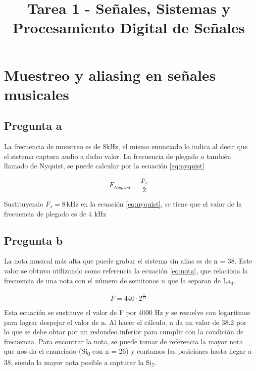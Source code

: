 \documentclass[conference]{IEEEtran}
\title{Tarea 1 - Señales, Sistemas y Procesamiento Digital de Señales}
\author{\IEEEauthorblockN{Zúñiga Ramírez Jose Eduardo}
\IEEEauthorblockA{Escuela de Ingeniería Electrónica \\
Instituto Tecnológico de Costa Rica \\
\{je.zuniga\}@estudiantec.cr}
}
\date{}
\begin{document}
\maketitle

\sloppy





\section{Muestreo y aliasing en señales musicales}

\subsection{Pregunta a}
La frecuencia de muestreo es de 8kHz, el mismo enunciado lo indica al decir que el sistema captura audio a dicho valor.
La frecuencia de plegado o también llamado de Nyquist, se puede calcular por la ecuación \eqref{eq:nyquist}

\begin{equation}
F_{Nyquist} = \frac{F_s}{2}
\label{eq:nyquist}
\end{equation}


Sustituyendo $F_s = 8\,\text{kHz}$ en la ecuación \eqref{eq:nyquist}, se tiene que el valor de la frecuencia de plegado es de 4 kHz

\subsection{Pregunta b}

La nota musical más alta que puede grabar el sistema sin alias es de n = 38.
Este valor se obtuvo utilizando como referencia la ecuación \eqref{eq:nota}, que relaciona la frecuencia de una nota con el número de semitonos $n$ que la separan de La\textsubscript{4}.

\begin{equation}
F = 440 \cdot 2^{\frac{n}{12}}
\label{eq:nota}
\end{equation}

Esta ecuación se sustituye el valor de F por 4000 Hz y se resuelve con logaritmos para lograr despejar el valor de n. 
Al hacer el cálculo, n da un valor de 38.2 por lo que se debe obtar por un redondeo inferior para cumplir con la condición de frecuencia. 
Para encontrar la nota, se puede tomar de referencia la mayor nota que nos da el enunciado (Si\textsubscript{6} con n = 26) y contamos las posiciones hasta llegar a 38, siendo la mayor nota posible a capturar la Si\textsubscript{7}.
\end{document}
